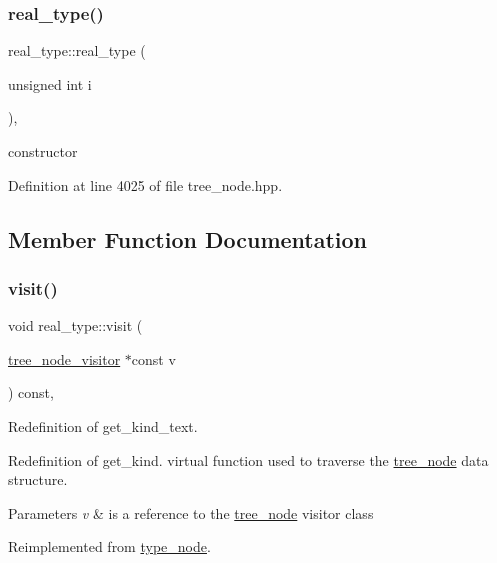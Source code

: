 \subsubsection{\texorpdfstring{real\+\_\+type()}{real\_type()}}
{\footnotesize\ttfamily real\+\_\+type\+::real\+\_\+type (\begin{DoxyParamCaption}\item[{unsigned int}]{i }\end{DoxyParamCaption})\hspace{0.3cm}{\ttfamily [inline]}, {\ttfamily [explicit]}}



constructor 



Definition at line 4025 of file tree\+\_\+node.\+hpp.



\subsection{Member Function Documentation}
\mbox{\label{structreal__type_a9f45291aa61c33e2abba3618ce224dc3}} 
\subsubsection{\texorpdfstring{visit()}{visit()}}
{\footnotesize\ttfamily void real\+\_\+type\+::visit (\begin{DoxyParamCaption}\item[{\hyperlink{classtree__node__visitor}{tree\+\_\+node\+\_\+visitor} $\ast$const}]{v }\end{DoxyParamCaption}) const\hspace{0.3cm}{\ttfamily [override]}, {\ttfamily [virtual]}}



Redefinition of get\+\_\+kind\+\_\+text. 

Redefinition of get\+\_\+kind. virtual function used to traverse the \hyperlink{classtree__node}{tree\+\_\+node} data structure. 
\begin{DoxyParams}{Parameters}
{\em v} & is a reference to the \hyperlink{classtree__node}{tree\+\_\+node} visitor class \\
\hline
\end{DoxyParams}


Reimplemented from \hyperlink{structtype__node_adc6e447af5f9505e6305320933c46a96}{type\+\_\+node}.



